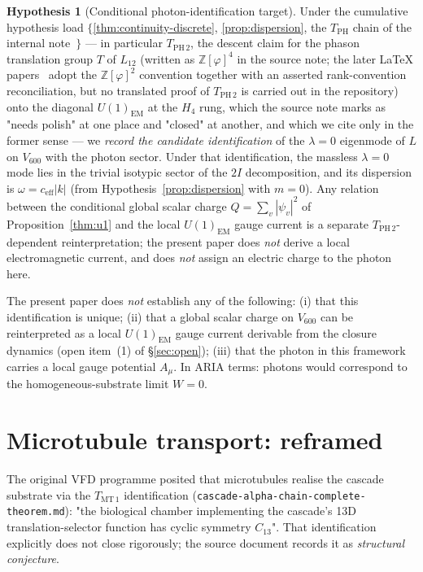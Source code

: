 \documentclass[11pt]{article}
\theoremstyle{definition}
\newtheorem{hypothesis}[theorem]{Hypothesis}
\newcommand{\Zphi}{\mathbb{Z}[\varphi]}
\begin{document}
\begin{hypothesis}[Conditional photon-identification target]\label{cor:photon}
Under the cumulative hypothesis load $\{$\ref{thm:continuity-discrete}, \ref{prop:dispersion}, the $T_{\text{PH}}$ chain of the internal note~\citep{CascadeAlphaChain}$\}$ --- in particular $T_{\text{PH}\,2}$, the descent claim for the phason translation group $T$ of $L_{12}$ (written as $\Zphi^4$ in the source note; the later LaTeX papers~\citep{Cascade12D, SmartXXXIV} adopt the $\Zphi^2$ convention together with an asserted rank-convention reconciliation, but no translated proof of $T_{\text{PH}\,2}$ is carried out in the repository) onto the diagonal $U(1)_{\text{EM}}$ at the $H_4$ rung, which the source note marks as "needs polish" at one place and "closed" at another, and which we cite only in the former sense --- we \emph{record the candidate identification} of the $\lambda = 0$ eigenmode of $L$ on $V_{600}$ with the photon sector. Under that identification, the massless $\lambda = 0$ mode lies in the trivial isotypic sector of the $2I$ decomposition, and its dispersion is $\omega = c_{\text{eff}}|k|$ (from Hypothesis~\ref{prop:dispersion} with $m = 0$). Any relation between the conditional global scalar charge $Q = \sum_v |\psi_v|^2$ of Proposition~\ref{thm:u1} and the local $U(1)_{\text{EM}}$ gauge current is a separate $T_{\text{PH}\,2}$-dependent reinterpretation; the present paper does \emph{not} derive a local electromagnetic current, and does \emph{not} assign an electric charge to the photon here.

The present paper does \emph{not} establish any of the following: (i) that this identification is unique; (ii) that a global scalar charge on $V_{600}$ can be reinterpreted as a local $U(1)_{\text{EM}}$ gauge current derivable from the closure dynamics (open item~(1) of \S\ref{sec:open}); (iii) that the photon in this framework carries a local gauge potential $A_\mu$. In ARIA terms: photons would correspond to the homogeneous-substrate limit $W = 0$.
\end{hypothesis}

\section{Microtubule transport: reframed}\label{sec:microtubule}

The original VFD programme posited that microtubules realise the cascade substrate via the $T_{\text{MT}\,1}$ identification (\texttt{cascade-alpha-chain-complete-theorem.md}): "the biological chamber implementing the cascade's 13D translation-selector function has cyclic symmetry $C_{13}$". That identification explicitly does not close rigorously; the source document records it as \emph{structural conjecture}.
\end{document}

